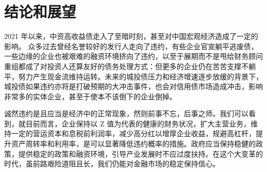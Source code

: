 
\chapter{结论和展望}

2021 年以来，中资高收益债走入了至暗时刻，甚至对中国宏观经济造成了一定的影响。
众多过去曾经名誉较好的发行人走向了违约，有些企业官宣躺平逃废债，一些边缘的企业也被艰难的融资环境挤向了违约，以至于展期而不是甩给财务顾问重组都成了对投资人还算友好的债务处理方式：但更多的企业仍在苦苦支撑不躺平，努力产生现金流维持运转。未来的城投债压力和经济增速逐步放缓的背景下，城投债如果违约亦将是打破预期的大冲击事件，也会对信用债市场造成冲击，影响非常多的实体企业，甚至于使本不该倒下的企业倒掉。

诚然违约是且应当是经济中的正常现象，然则前事不忘，后事之师。我们可以看到，就目前而言，企业保持以 Z 值为代表的健康的财务状况，扩大主营业务，维持一定的营运资本和息税前利润率，减少高分红以增厚企业收益，规避高杠杆，提升资产周转率和利用率，是可以显著降低违约概率的措施。政府应当保持稳健的政策，提供稳定的政策和融资环境，引导产业发展时不应过度扶持。在这个大变革的时代，虽前路艰险道阻且长，我们仍能对金融市场的稳定保持信心。
